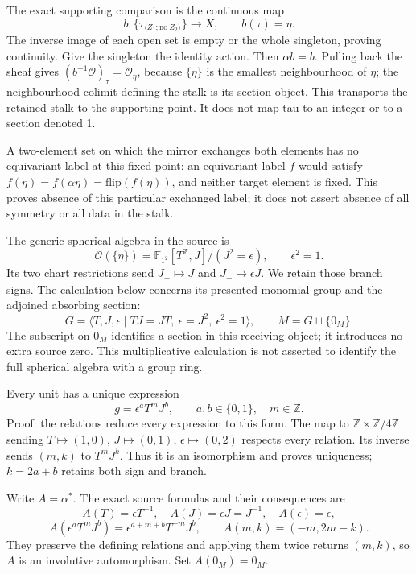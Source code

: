The exact supporting comparison is the continuous map \[
b:\{\tau_{\langle Z_1;\mathrm{no}\ Z_2\rangle}\}\longrightarrow X,
\qquad b(\tau)=\eta.
\] The inverse image of each open set is empty or the whole singleton, proving continuity. Give the singleton the identity action. Then \(\alpha b=b\). Pulling back the sheaf gives \((b^{-1}\mathcal O)_\tau=\mathcal O_\eta\), because \(\{\eta\}\) is the smallest neighbourhood of \(\eta\); the neighbourhood colimit defining the stalk is its section object. This transports the retained stalk to the supporting point. It does not map tau to an integer or to a section denoted 1.

A two-element set on which the mirror exchanges both elements has no equivariant label at this fixed point: an equivariant label \(f\) would satisfy \(f(\eta)=f(\alpha\eta)=\mathrm{flip}(f(\eta))\), and neither target element is fixed. This proves absence of this particular exchanged label; it does not assert absence of all symmetry or all data in the stalk.

The generic spherical algebra in the source is \[
\mathcal O(\{\eta\})=\mathbb F_{1^2}[T^{\mathbb Z},J]/(J^2=\epsilon),
\qquad \epsilon^2=1.
\] Its two chart restrictions send \(J_+\mapsto J\) and \(J_-\mapsto\epsilon J\). We retain those branch signs. The calculation below concerns its presented monomial group and the adjoined absorbing section: \[
G=\langle T,J,\epsilon\mid TJ=JT,\ \epsilon=J^2,\ \epsilon^2=1\rangle,
\qquad M=G\sqcup\{0_M\}.
\] The subscript on \(0_M\) identifies a section in this receiving object; it introduces no extra source zero. This multiplicative calculation is not asserted to identify the full spherical algebra with a group ring.

Every unit has a unique expression \[
g=\epsilon^aT^mJ^b,\qquad a,b\in\{0,1\},\quad m\in\mathbb Z.
\] Proof: the relations reduce every expression to this form. The map to \(\mathbb Z\times\mathbb Z/4\mathbb Z\) sending \(T\mapsto(1,0)\), \(J\mapsto(0,1)\), \(\epsilon\mapsto(0,2)\) respects every relation. Its inverse sends \((m,k)\) to \(T^mJ^k\). Thus it is an isomorphism and proves uniqueness; \(k=2a+b\) retains both sign and branch.

Write \(A=\alpha^*\). The exact source formulas and their consequences are \[
A(T)=\epsilon T^{-1},\quad A(J)=\epsilon J=J^{-1},\quad A(\epsilon)=\epsilon,
\] \[
A(\epsilon^aT^mJ^b)=\epsilon^{a+m+b}T^{-m}J^b,
\qquad A(m,k)=(-m,2m-k).
\] They preserve the defining relations and applying them twice returns \((m,k)\), so \(A\) is an involutive automorphism. Set \(A(0_M)=0_M\).

